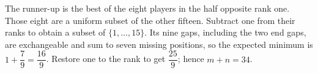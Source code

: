 The runner-up is the best of the eight players in the half opposite rank one. Those eight are a uniform subset of the other fifteen. Subtract one from their ranks to obtain a subset of $\{1,\ldots,15\}$. Its nine gaps, including the two end gaps, are exchangeable and sum to seven missing positions, so the expected minimum is $1+\dfrac{7}{9}=\dfrac{16}{9}$. Restore one to the rank to get $\dfrac{25}{9}$; hence $\boxed{m+n=34}$.

